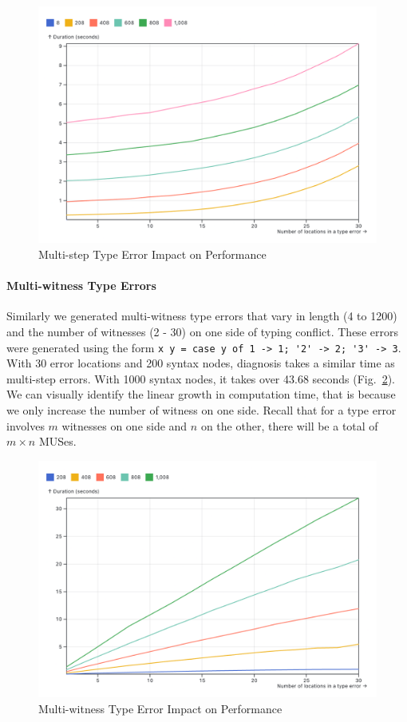 \documentclass[pdflatex,sn-nature,Numbered]{sn-jnl}%
\begin{document}
\begin{figure}[ht]
    \centering
    \includegraphics[width=0.8\linewidth]{images/multi-step.png}
    \caption{Multi-step Type Error Impact on Performance}
    \label{fig:multi-step-time}
\end{figure}

\paragraph{Multi-witness Type Errors}

Similarly we generated multi-witness type errors that vary in length (4 to 1200) and the number of witnesses (2 - 30) on one side of typing conflict. These errors were generated using the form \lstinline{x y = case y of 1 -> 1; '2' -> 2; '3' -> 3}. With 30 error locations and 200 syntax nodes, diagnosis takes a similar time as multi-step errors. With 1000 syntax nodes, it takes over 43.68 seconds (Fig.~\ref{fig:multi-witness-time}).  We can visually identify the linear growth in computation time, that is because we only increase the number of witness on one side. Recall that for a type error involves $m$ witnesses on one side and $n$ on the other, there will be a total of $m \times n$ MUSes.

\begin{figure}[ht]
    \centering
    \includegraphics[width=0.8\linewidth]{images/multi-witness-time.png}
    \caption{Multi-witness Type Error Impact on Performance}
    \label{fig:multi-witness-time}
\end{figure}
\end{document}
